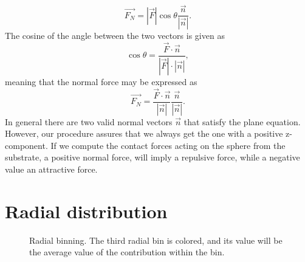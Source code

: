 \documentclass[twoside,english]{uiofysmaster}
\newcommand\lr[1]{\left(#1\right)}
\begin{document}
\begin{equation}
	\vec{F_N} 
	= |\vec{F}|\cos{\theta}\frac{\vec{n}}{|\vec{n}|} .
\end{equation}
The cosine of the angle between the two vectors is given as
\begin{equation}
	\cos{\theta} = \frac{\vec{F}\cdot\vec{n}}{|\vec{F}| \cdot |\vec{n}|},
\end{equation} 
meaning that the normal force may be expressed as
\begin{equation} 
\vec{F_N} = \frac{\vec{F}\cdot\vec{n}}{|\vec{n}|} \frac{\vec{n}}{|\vec{n}|} .
\end{equation}
In general there are two valid normal vectors $\vec{n}$ that satisfy the plane equation. However, our procedure assures that we always get the one with a positive z-component.  
If we compute the contact forces acting on the sphere from the substrate, a positive normal force, will imply a repulsive force, while a negative value an attractive force.


%




\section{Radial distribution}
\begin{figure}[H]
	\centering
	\resizebox{0.4\linewidth}{!}{
		
	}
	\caption{Radial binning. The third radial bin is colored, and its value will be the average value of the contribution within the bin.}%
	\label{fig:radialBinningSmooth}
\end{figure}
\end{document}
